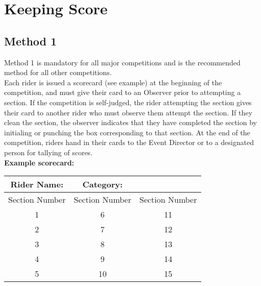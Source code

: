 \section{Keeping Score}

\subsection{Method 1}
Method 1 is mandatory for all major competitions and is the recommended method for all other competitions.\\
Each rider is issued a scorecard (see example) at the beginning of the competition, and must give their card to an
Observer prior to attempting a section. If the competition is self-judged, the rider attempting the section gives their card
to another rider who must observe them attempt the section. If they clean the section, the observer indicates that they
have completed the section by initialing or punching the box corresponding to that section. At the end of the
competition, riders hand in their cards to the Event Director or to a designated person for tallying of scores.\\
\textbf{Example scorecard:}\\\begin{tabular}{|c|c|c|}
\hline 
\textbf{Rider Name:} & \textbf{Category:} &  \\ 
\hline 
Section Number  & Section Number  & Section Number \\ 
\hline 
1 & 6 & 11 \\ 
\hline 
2 & 7 & 12 \\ 
\hline 
3 & 8 & 13 \\ 
\hline 
4 & 9 & 14 \\ 
\hline 
5 & 10 & 15 \\ 
\hline 
\end{tabular}

